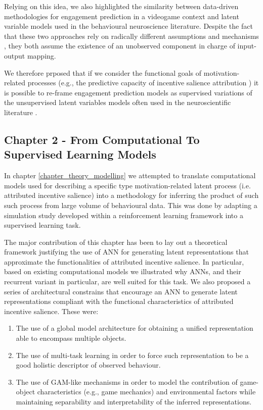 Relying on this idea, we also highlighted the similarity between data-driven methodologies for engagement prediction in a videogame context and latent variable models used in the behavioural neuroscience literature. Despite the fact that these two approaches rely on radically different assumptions and mechanisms \cite{murphy2022probabilistic}, they both assume the existence of an unobserved component in charge of input-output mapping.

We therefore prposed that if we consider the functional goals of motivation-related processes (e.g., the predictive capacity of incentive salience attribution \cite{berridge2004motivation}) it is possible to re-frame engagement prediction models as supervised variations of the unsupervised latent variables models often used in the neuroscientific literature \cite{luxem2020identifying, mccullough2021unsupervised}.

\subsection{Chapter 2 - From Computational To Supervised Learning Models}
\label{discussion_chapter_two}
In chapter \ref{chapter_theory_modelling} we attempted to translate computational models used for describing a specific type motivation-related latent process (i.e. attributed incentive salience) into a methodology for inferring  the product of such such process from large volume of behavioural data. This was done by adapting a simulation study developed within a reinforcement learning framework into a supervised learning task.

The major contribution of this chapter has been to lay out a theoretical framework justifying the use of ANN for generating latent representations that approximate the functionalities of attributed incentive salience. In particular, based on existing computational models \cite{mcclure2003computational, zhang2009neural} we illustrated why ANNs, and their recurrent variant in particular, are well suited for this task. We also proposed a series of architectural constrains that encourage an ANN to generate latent representations compliant with the functional characteristics of attributed incentive salience. These were:

\begin{enumerate}
    \item The use of a global model architecture for obtaining a unified representation able to encompass multiple objects.
    \item The use of multi-task learning in order to force such representation to be a good holistic descriptor of observed behaviour.
    \item The use of GAM-like mechanisms in order to model the contribution of game-object characteristics (e.g., game mechanics) and environmental factors while maintaining separability and interpretability of the inferred representations.
\end{enumerate}

